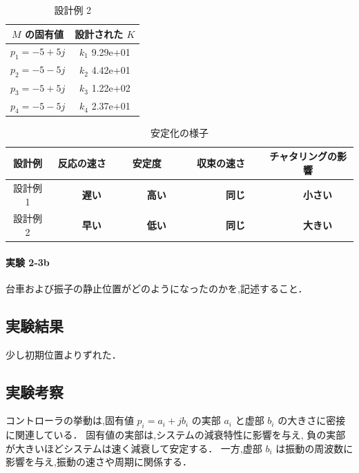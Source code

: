 \begin{table}[h]
  \centering
  \caption{設計例 2}
  \label{tab:design_example_2}
  \begin{tabular}{|c|c|}
    \hline
    \( M \) の固有値    & 設計された \( K \)  \\
    \hline
    \( p_1 = -5 + 5j \) & \( k_1 \)  9.29e+01 \\
    \( p_2 = -5 - 5j \) & \( k_2 \) 4.42e+01  \\
    \( p_3 = -5 + 5j \) & \( k_3 \)  1.22e+02 \\
    \( p_4 = -5 - 5j \) & \( k_4 \)  2.37e+01 \\
    \hline
  \end{tabular}
\end{table}

\begin{table}[h]
  \centering
  \caption{安定化の様子}
  \label{tab:stabilization_observation}
  \begin{tabular}{|c|c|c|c|c|}
    \hline
    設計例   & 反応の速さ                    & 安定度                        & 収束の速さ                        & チャタリングの影響              \\
    \hline
    設計例 1 & {\large\textbf{　　遅い　　}} & {\large\textbf{　　高い　　}} & {\large\textbf{　　　同じ　　　}} & {\large\textbf{　　小さい　　}} \\
    設計例 2 & {\large\textbf{　　早い　　}} & {\large\textbf{　　低い　　}} & {\large\textbf{　　　同じ　　　}} & {\large\textbf{　　大きい　　}} \\
    \hline
  \end{tabular}
\end{table}

\paragraph{実験 2-3b}
台車および振子の静止位置がどのようになったのかを,記述すること．

\subsection{実験結果}
少し初期位置よりずれた．

\subsection{実験考察}
コントローラの挙動は,固有値 \( p_i = a_i + jb_i \) の実部 \( a_i \) と虚部 \( b_i \) 
の大きさに密接に関連している．
固有値の実部は,システムの減衰特性に影響を与え,
負の実部が大きいほどシステムは速く減衰して安定する．
一方,虚部 \( b_i \) は振動の周波数に影響を与え,振動の速さや周期に関係する．

